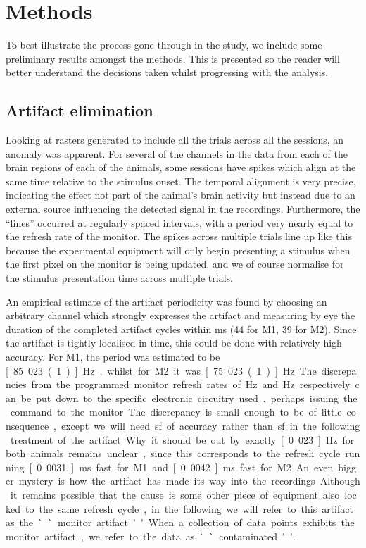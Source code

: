 \section{Methods}

To best illustrate the process gone through in the study, we include some preliminary results amongst the methods.
This is presented so the reader will better understand the decisions taken whilst progressing with the analysis.

\FloatBarrier
\subsection{Artifact elimination}
\label{sec:ma}

Looking at rasters generated to include all the trials across all the sessions, an anomaly was apparent.
For several of the channels in the data from each of the brain regions of each of the animals, some sessions have spikes which align at the same time relative to the stimulus onset.
The temporal alignment is very precise, indicating the effect not part of the animal's brain activity but instead due to an external source influencing the detected signal in the recordings.
Furthermore, the ``lines'' occurred at regularly spaced intervals, with a period very nearly equal to the refresh rate of the monitor.
The spikes across multiple trials line up like this because the experimental equipment will only begin presenting a stimulus when the first pixel on the monitor is being updated, and we of course normalise for the stimulus presentation time across multiple trials.

An empirical estimate of the artifact periodicity was found by choosing an arbitrary channel which strongly expresses the artifact and measuring by eye the duration of the completed artifact cycles within \unit[530]{ms} (44 for \ac{M1}, 39 for \ac{M2}).
Since the artifact is tightly localised in time, this could be done with relatively high accuracy.
For \ac{M1}, the period was estimated to be \unit[85.023(1)]{Hz}, whilst for \ac{M2} it was \unit[75.023(1)]{Hz}.
The discrepancies from the programmed monitor refresh rates of \unit[85]{Hz} and \unit[75]{Hz} respectively can be put down to the specific electronic circuitry used, perhaps issuing the command to the monitor.
The discrepancy is small enough to be of little consequence, except we will need \unit[5]{sf} of accuracy rather than \unit[2]{sf} in the following treatment of the artifact.
Why it should be out by exactly \unit[0.023]{Hz} for both animals remains unclear, since this corresponds to the refresh cycle running \unit[0.0031]{ms} fast for \ac{M1} and \unit[0.0042]{ms} fast for \ac{M2}.
An even bigger mystery is how the artifact has made its way into the recordings.
Although it remains possible that the cause is some other piece of equipment also locked to the same refresh cycle, in the following we will refer to this artifact as the ``monitor artifact''.
When a collection of data points exhibits the monitor artifact, we refer to the data as ``contaminated''.

